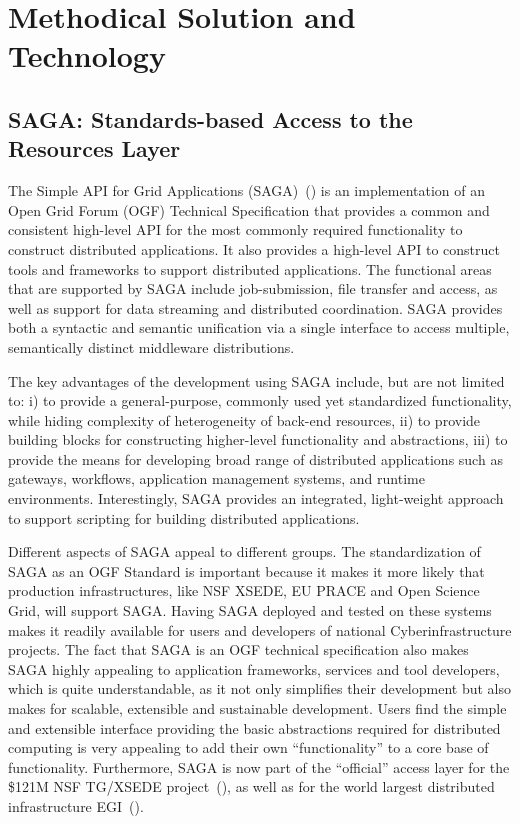 \documentclass{sig-alternate}
\begin{document}
\section{Methodical Solution and Technology}


\subsection{SAGA: Standards-based Access to the Resources Layer}

The Simple API for Grid Applications (SAGA)~(\cite{saga_url}) is an
implementation of an Open Grid Forum (OGF) Technical Specification
that provides a common and consistent high-level API for the most
commonly required functionality to construct distributed applications.
It also provides a high-level API to construct tools and frameworks to
support distributed applications. The functional areas that are
supported by SAGA include job-submission, file transfer and access, as
well as support for data streaming and distributed coordination. SAGA
provides both a syntactic and semantic unification via a single
interface to access multiple, semantically distinct middleware
distributions.


The key advantages of the development using SAGA include, but are not
limited to: i) to provide a general-purpose, commonly used yet
standardized functionality, while hiding complexity of heterogeneity
of back-end resources, ii) to provide building blocks for constructing
higher-level functionality and abstractions, iii) to provide the means
for developing broad range of distributed applications such as
gateways, workflows, application management systems, and runtime
environments. Interestingly, SAGA provides an integrated, light-weight
approach to support scripting for building distributed applications.

Different aspects of SAGA appeal to different groups. The
standardization of SAGA as an OGF Standard is important because it
makes it more likely that production infrastructures, like NSF XSEDE,
EU PRACE and Open Science Grid, will support SAGA. Having SAGA
deployed and tested on these systems makes it readily available for
users and developers of national Cyberinfrastructure projects. The
fact that SAGA is an OGF technical specification also makes SAGA
highly appealing to application frameworks, services and tool
developers, which is quite understandable, as it not only simplifies
their development but also makes for scalable, extensible and
sustainable development. Users find the simple and extensible
interface providing the basic abstractions required for distributed
computing is very appealing to add their own ``functionality'' to a
core base of functionality. Furthermore, SAGA is now part of the
``official'' access layer for the \$121M NSF TG/XSEDE
project~(\cite{xsede_url}), as well as for the world largest distributed
infrastructure EGI~(\cite{egi_url}).
\end{document}
